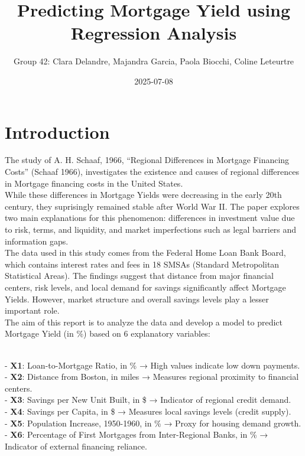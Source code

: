 \documentclass[
  12pt,
]{article}
\title{\textbf{Predicting Mortgage Yield using Regression Analysis}}
\author{Group 42: Clara Delandre, Majandra Garcia, Paola Biocchi, Coline
Leteurtre}
\date{2025-07-08}
\begin{document}
\maketitle

\section{Introduction}\label{introduction}

The study of A. H. Schaaf, 1966, ``Regional Differences in Mortgage
Financing Costs'' (Schaaf 1966), investigates the existence and causes
of regional differences in Mortgage financing costs in the United
States.\\
While these differences in Mortgage Yields were decreasing in the early
20th century, they suprisingly remained stable after World War II. The
paper explores two main explanations for this phenomenon: differences in
investment value due to risk, terms, and liquidity, and market
imperfections such as legal barriers and information gaps.\\
The data used in this study comes from the Federal Home Loan Bank Board,
which contains interest rates and fees in 18 SMSAs (Standard
Metropolitan Statistical Areas). The findings suggest that distance from
major financial centers, risk levels, and local demand for savings
significantly affect Mortgage Yields. However, market structure and
overall savings levels play a lesser important role.\\
The aim of this report is to analyze the data and develop a model to
predict Mortgage Yield (in \%) based on 6 explanatory variables:\\
\strut \\
- \textbf{X1}: Loan-to-Mortgage Ratio, in \% → High values indicate low
down payments.\\
- \textbf{X2}: Distance from Boston, in miles → Measures regional
proximity to financial centers.\\
- \textbf{X3}: Savings per New Unit Built, in \$ → Indicator of regional
credit demand.\\
- \textbf{X4}: Savings per Capita, in \$ → Measures local savings levels
(credit supply).\\
- \textbf{X5}: Population Increase, 1950-1960, in \% → Proxy for housing
demand growth.\\
- \textbf{X6}: Percentage of First Mortgages from Inter-Regional Banks,
in \% → Indicator of external financing reliance. \vspace{-1em}
\end{document}

